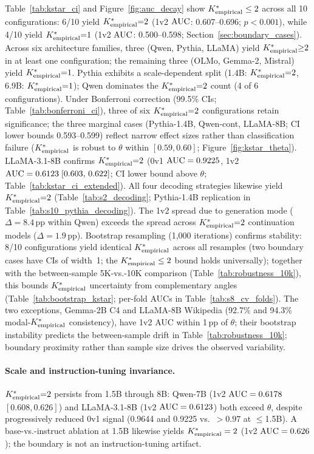 Table~\ref{tab:kstar_ci} and Figure~\ref{fig:auc_decay} show ${K^*_{\text{empirical}}} \leq 2$ across all 10 configurations: 6/10 yield ${K^*_{\text{empirical}}}{=}2$ (1v2 $\text{AUC}$: 0.607--0.696; $p < 0.001$), while 4/10 yield ${K^*_{\text{empirical}}}{=}1$ (1v2 $\text{AUC}$: 0.500--0.598; Section~\ref{sec:boundary_cases}).
Across six architecture families, three (Qwen, Pythia, LLaMA) yield ${K^*_{\text{empirical}}}{\geq}2$ in at least one configuration; the remaining three (OLMo, Gemma-2, Mistral) yield ${K^*_{\text{empirical}}}{=}1$.
Pythia exhibits a scale-dependent split (1.4B: ${K^*_{\text{empirical}}}{=}2$, 6.9B: ${K^*_{\text{empirical}}}{=}1$); Qwen dominates the ${K^*_{\text{empirical}}}{=}2$ count (4 of 6 configurations).
Under Bonferroni correction (99.5\% CIs; Table~\ref{tab:bonferroni_ci}), three of six ${K^*_{\text{empirical}}}{=}2$ configurations retain significance; the three marginal cases (Pythia-1.4B, Qwen-cont, LLaMA-8B; CI lower bounds 0.593--0.599) reflect narrow effect sizes rather than classification failure (${K^*_{\text{empirical}}}$ is robust to $\theta$ within $[0.59, 0.60]$; Figure~\ref{fig:kstar_theta}).
LLaMA-3.1-8B confirms ${K^*_{\text{empirical}}}{=}2$ (0v1 $\text{AUC} = 0.9225$, 1v2 $\text{AUC} = 0.6123\;[0.603,\,0.622]$; CI lower bound above $\theta$; Table~\ref{tab:kstar_ci_extended}).
All four decoding strategies likewise yield ${K^*_{\text{empirical}}}{=}2$ (Table~\ref{tab:s2_decoding}; Pythia-1.4B replication in Table~\ref{tab:s10_pythia_decoding}).
The 1v2 spread due to generation mode ($\Delta = 8.4$\,pp within Qwen) exceeds the spread across ${K^*_{\text{empirical}}}{=}2$ continuation models ($\Delta = 1.9$\,pp).
Bootstrap resampling (1{,}000 iterations) confirms stability: 8/10 configurations yield identical ${K^*_{\text{empirical}}}$ across all resamples (two boundary cases have CIs of width~1; the ${K^*_{\text{empirical}}} \leq 2$ bound holds universally); together with the between-sample 5K-vs.-10K comparison (Table~\ref{tab:robustness_10k}), this bounds ${K^*_{\text{empirical}}}$ uncertainty from complementary angles (Table~\ref{tab:bootstrap_kstar}; per-fold AUCs in Table~\ref{tab:s8_cv_folds}).
The two exceptions, Gemma-2B C4 and LLaMA-8B Wikipedia (92.7\% and 94.3\% modal-${K^*_{\text{empirical}}}$ consistency), have 1v2 AUC within 1\,pp of $\theta$; their bootstrap instability predicts the between-sample drift in Table~\ref{tab:robustness_10k}; boundary proximity rather than sample size drives the observed variability.

\paragraph{Scale and instruction-tuning invariance.}
${K^*_{\text{empirical}}}{=}2$ persists from 1.5B through 8B: Qwen-7B (1v2 $\text{AUC} = 0.6178$ $[0.608, 0.626]$) and LLaMA-3.1-8B (1v2 $\text{AUC} = 0.6123$) both exceed $\theta$, despite progressively reduced 0v1 signal (0.9644 and 0.9225 vs.\ $> 0.97$ at $\leq$1.5B).
A base-vs.-instruct ablation at 1.5B likewise yields ${K^*_{\text{empirical}}} = 2$ (1v2 $\text{AUC} = 0.626$); the boundary is not an instruction-tuning artifact.

